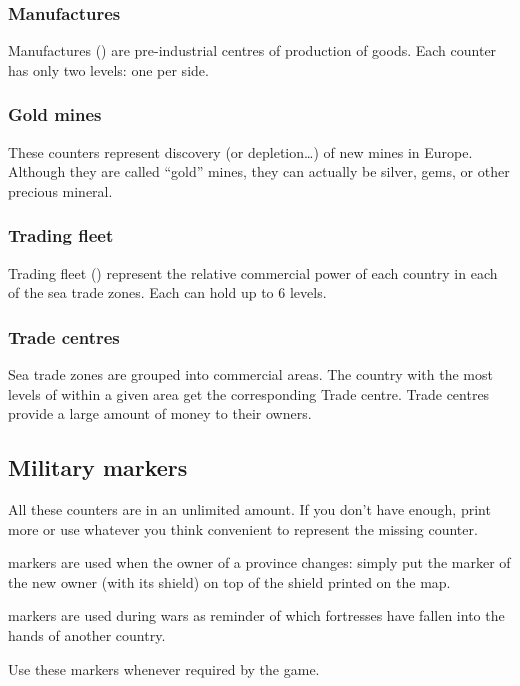 \subsubsection{Manufactures}
\aparag Manufactures (\MNU) are pre-industrial centres of production of goods.
\bparag Each counter has only two levels: one per side.


\subsubsection{Gold mines}
\aparag These counters represent discovery (or depletion\ldots) of new mines
in Europe.
\bparag Although they are called ``gold'' mines, they can actually be silver,
gems, or other precious mineral.


\subsubsection{Trading fleet}
\aparag Trading fleet (\TradeFLEET) represent the relative commercial power of
each country in each of the sea trade zones.
\bparag Each \TradeFLEET can hold up to 6 levels.


\subsubsection{Trade centres}
\aparag Sea trade zones are grouped into commercial areas. The country with
the most levels of \TradeFLEET within a given area get the corresponding Trade
centre.
\bparag Trade centres provide a large amount of money to their owners.



\subsection{Military markers}

\aparag All these counters are in an unlimited amount. If you don't have
enough, print more or use whatever you think convenient to represent the
missing counter.

\aparag[Ownership] markers are used when the owner of a province changes:
simply put the marker of the new owner (with its shield) on top of the shield
printed on the map.

\aparag[Control] markers are used during wars as reminder of which fortresses
have fallen into the hands of another country.

 Use these markers whenever
required by the game.



